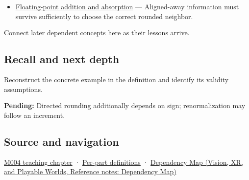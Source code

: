 \hypertarget{appendix-b572b631069b-used-by}{}

\begin{itemize}
\tightlist
\item
  \hyperref[appendix-a1b1b4580dfd]{Floating-point addition and absorption} --- Aligned-away information must survive sufficiently to choose the correct rounded neighbor.
\end{itemize}

Connect later dependent concepts here as their lessons arrive.

\subsection{Recall and next depth}\label{appendix-b572b631069b-recall-and-next-depth}

\hypertarget{appendix-b572b631069b-recall-and-next-depth}{}

Reconstruct the concrete example in the definition and identify its validity assumptions.

\textbf{Pending:} Directed rounding additionally depends on sign; renormalization may follow an increment.

\subsection{Source and navigation}\label{appendix-b572b631069b-source-and-navigation}

\hypertarget{appendix-b572b631069b-source-and-navigation}{}

\hyperref[01-foundations-i-ch001-a-stretching-ruler-for-real-valued-quantities]{M004 teaching chapter} · \hyperref[appendix-fd090d982a15-m004---parts-61-76]{Per-part definitions} · \href{../07-Vision-XR-and-Playable-Worlds/main.pdf\#nameddest=appendix-4ad47bdd269a}{Dependency Map (Vision, XR, and Playable Worlds, Reference notes: Dependency Map)}
